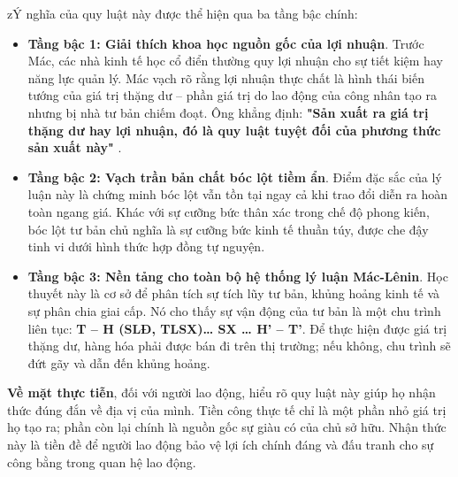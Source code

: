 zÝ nghĩa của quy luật này được thể hiện qua ba tầng bậc chính:
\begin{itemize}
    \item \textbf{Tầng bậc 1: Giải thích khoa học nguồn gốc của lợi nhuận}. Trước Mác, các nhà kinh tế học cổ điển thường quy lợi nhuận cho sự tiết kiệm hay năng lực quản lý. Mác vạch rõ rằng lợi nhuận thực chất là hình thái biến tướng của giá trị thặng dư – phần giá trị do lao động của công nhân tạo ra nhưng bị nhà tư bản chiếm đoạt. Ông khẳng định: \textbf{"Sản xuất ra giá trị thặng dư hay lợi nhuận, đó là quy luật tuyệt đối của phương thức sản xuất này"} \cite[trang 871]{marx_engels_23}.
    \item \textbf{Tầng bậc 2: Vạch trần bản chất bóc lột tiềm ẩn}. Điểm đặc sắc của lý luận này là chứng minh bóc lột vẫn tồn tại ngay cả khi trao đổi diễn ra hoàn toàn ngang giá. Khác với sự cưỡng bức thân xác trong chế độ phong kiến, bóc lột tư bản chủ nghĩa là sự cưỡng bức kinh tế thuần túy, được che đậy tinh vi dưới hình thức hợp đồng tự nguyện.
    \item \textbf{Tầng bậc 3: Nền tảng cho toàn bộ hệ thống lý luận Mác-Lênin}. Học thuyết này là cơ sở để phân tích sự tích lũy tư bản, khủng hoảng kinh tế và sự phân chia giai cấp. Nó cho thấy sự vận động của tư bản là một chu trình liên tục: \textbf{T – H (SLĐ, TLSX)… SX … H’ – T’}. Để thực hiện được giá trị thặng dư, hàng hóa phải được bán đi trên thị trường; nếu không, chu trình sẽ đứt gãy và dẫn đến khủng hoảng.
\end{itemize}
\textbf{Về mặt thực tiễn}, đối với người lao động, hiểu rõ quy luật này giúp họ nhận thức đúng đắn về địa vị của mình. Tiền công thực tế chỉ là một phần nhỏ giá trị họ tạo ra; phần còn lại chính là nguồn gốc sự giàu có của chủ sở hữu. Nhận thức này là tiền đề để người lao động bảo vệ lợi ích chính đáng và đấu tranh cho sự công bằng trong quan hệ lao động.